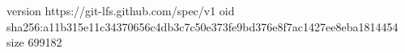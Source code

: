 version https://git-lfs.github.com/spec/v1
oid sha256:a11b315e11c34370656c4db3c7c50e373fe9bd376e8f7ac1427ee8eba1814454
size 699182
